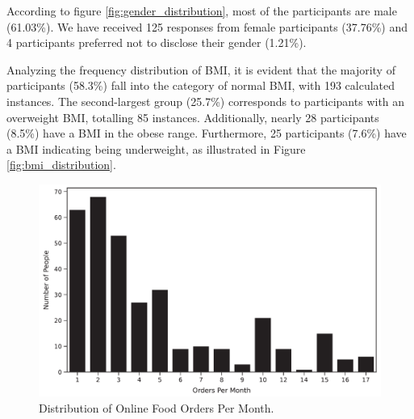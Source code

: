 \documentclass[a4paper,fleqn]{cas-sc}
\begin{document}
According to figure \ref{fig:gender_distribution}, most of the participants are male (61.03\%). We have received 125 responses from female participants (37.76\%) and 4 participants preferred not to disclose their gender (1.21\%).


Analyzing the frequency distribution of BMI, it is evident that the majority of participants (58.3\%) fall into the category of normal BMI, with 193 calculated instances. The second-largest group (25.7\%) corresponds to participants with an overweight BMI, totalling 85 instances. Additionally, nearly 28 participants (8.5\%) have a BMI in the obese range. Furthermore, 25 participants (7.6\%) have a BMI indicating being underweight, as illustrated in Figure \ref{fig:bmi_distribution}.

\begin{figure}[htb]
  \centering
  \includegraphics[width = \textwidth]{figs/order_frequency.pdf}
  \caption{Distribution of Online Food Orders Per Month.}
  \label{fig:orders_frequency}
\end{figure}
\end{document}
